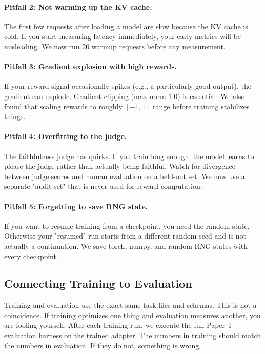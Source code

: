 \documentclass[11pt]{article}
\begin{document}
\paragraph{Pitfall 2: Not warming up the KV cache.}
The first few requests after loading a model are slow because the KV cache is cold.
If you start measuring latency immediately, your early metrics will be misleading.
We now run 20 warmup requests before any measurement.

\paragraph{Pitfall 3: Gradient explosion with high rewards.}
If your reward signal occasionally spikes (e.g., a particularly good output), the gradient can explode.
Gradient clipping (max norm 1.0) is essential.
We also found that scaling rewards to roughly $[-1, 1]$ range before training stabilizes things.

\paragraph{Pitfall 4: Overfitting to the judge.}
The faithfulness judge has quirks.
If you train long enough, the model learns to please the judge rather than actually being faithful.
Watch for divergence between judge scores and human evaluation on a held-out set.
We now use a separate "audit set" that is never used for reward computation.

\paragraph{Pitfall 5: Forgetting to save RNG state.}
If you want to resume training from a checkpoint, you need the random state.
Otherwise your "resumed" run starts from a different random seed and is not actually a continuation.
We save torch, numpy, and random RNG states with every checkpoint.

\subsection{Connecting Training to Evaluation}

Training and evaluation use the exact same task files and schemas.
This is not a coincidence.
If training optimizes one thing and evaluation measures another, you are fooling yourself.
After each training run, we execute the full Paper~I evaluation harness on the trained adapter.
The numbers in training should match the numbers in evaluation.
If they do not, something is wrong.
\end{document}
